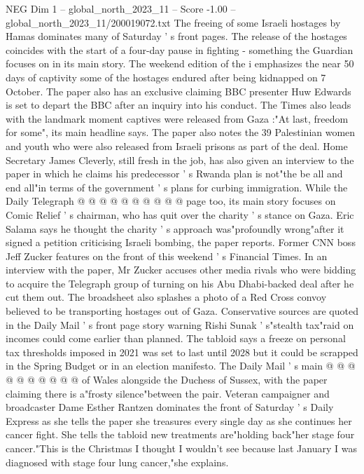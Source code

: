 \begin{textsample}{NEG Dim 1 – global\_north\_2023\_11 – Score -1.00 – global\_north\_2023\_11/200019072.txt}  \label{ex:f1_neg_097}
The freeing of some Israeli hostages by Hamas dominates many of Saturday ' s front pages.
The release of the hostages coincides with the start of a four-day pause in fighting - something the Guardian focuses on in its main story.
The weekend edition of the i emphasizes the near 50 days of captivity some of the hostages endured after being kidnapped on 7 October.
The paper also has an exclusive claiming BBC presenter Huw Edwards is set to depart the BBC after an inquiry into his conduct.
The Times also leads with the landmark moment captives were released from Gaza :"At last, freedom for some", its main headline says.
The paper also notes the 39 Palestinian women and youth who were also released from Israeli prisons as part of the deal.
Home Secretary James Cleverly, still fresh in the job, has also given an interview to the paper in which he claims his predecessor ' s Rwanda plan is not"the be all and end all"in terms of the government ' s plans for curbing immigration.
While the Daily Telegraph @ @ @ @ @ @ @ @ @ @ page too, its main story focuses on Comic Relief ' s chairman, who has quit over the charity ' s stance on Gaza.
Eric Salama says he thought the charity ' s approach was"profoundly wrong"after it signed a petition criticising Israeli bombing, the paper reports.
Former CNN boss Jeff Zucker features on the front of this weekend ' s Financial Times.
In an interview with the paper, Mr Zucker accuses other media rivals who were bidding to acquire the Telegraph group of turning on his Abu Dhabi-backed deal after he cut them out.
The broadsheet also splashes a photo of a Red Cross convoy believed to be transporting hostages out of Gaza.
Conservative sources are quoted in the Daily Mail ' s front page story warning Rishi Sunak ' s"stealth tax"raid on incomes could come earlier than planned.
The tabloid says a freeze on personal tax thresholds imposed in 2021 was set to last until 2028 but it could be scrapped in the Spring Budget or in an election manifesto.
The Daily Mail ' s main @ @ @ @ @ @ @ @ @ @ of Wales alongside the Duchess of Sussex, with the paper claiming there is a"frosty silence"between the pair.
Veteran campaigner and broadcaster Dame Esther Rantzen dominates the front of Saturday ' s Daily Express as she tells the paper she treasures every single day as she continues her cancer fight.
She tells the tabloid new treatments are"holding back"her stage four cancer."This is the Christmas I thought I wouldn't see because last January I was diagnosed with stage four lung cancer,"she explains.

\end{textsample}
